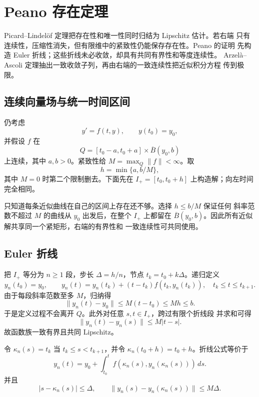 \chapter{Peano 存在定理}
\label{chap:peano-existence}

Picard--Lindelöf 定理把存在性和唯一性同时归结为 Lipschitz 估计。若右端
只有连续性，压缩性消失，但有限维中的紧致性仍能保存存在性。Peano 的证明
先构造 Euler 折线；这些折线未必收敛，却具有共同有界性和等度连续性。
Arzelà--Ascoli 定理抽出一致收敛子列，再由右端的一致连续性把近似积分方程
传到极限。

\section{连续向量场与统一时间区间}

仍考虑
\[
 y'=f(t,y),\qquad y(t_0)=y_0,
\]
并假设 \(f\) 在
\[
 Q=[t_0-a,t_0+a]\times\overline B(y_0,b)
\]
上连续，其中 \(a,b>0\)。紧致性给 \(M=\max_Q\|f\|<\infty\)。取
\[
 h=\min\{a,b/M\},
\]
其中 \(M=0\) 时第二个限制删去。下面先在
\(I_+=[t_0,t_0+h]\) 上构造解；向左时间完全相同。

只知道每条近似曲线在自己的区间上存在还不够。选择 \(h\le b/M\) 保证任何
斜率范数不超过 \(M\) 的曲线从 \(y_0\) 出发后，在整个 \(I_+\) 上都留在
\(\overline B(y_0,b)\)。因此所有近似解共享同一个紧矩形，右端的有界性和
一致连续性可共同使用。

\section{Euler 折线}

把 \(I_+\) 等分为 \(n\ge1\) 段，步长 \(\Delta=h/n\)，节点
\(t_k=t_0+k\Delta\)。递归定义
\[
 y_n(t_0)=y_0,\qquad
 y_n(t)=y_n(t_k)+(t-t_k)f(t_k,y_n(t_k)),
 \quad t_k\le t\le t_{k+1}.
\]
由于每段斜率范数至多 \(M\)，归纳得
\[
 \|y_n(t)-y_0\|\le M(t-t_0)\le Mh\le b.
\]
于是定义过程不会离开 \(Q\)。此外对任意 \(s,t\in I_+\)，跨过有限个折线段
并求和可得
\begin{equation}\label{eq:euler-equilipschitz}
 \|y_n(t)-y_n(s)\|\le M|t-s|.
\end{equation}
故函数族一致有界且共同 Lipschitz。

令 \(\kappa_n(s)=t_k\) 当 \(t_k\le s<t_{k+1}\)，并令
\(\kappa_n(t_0+h)=t_0+h\)。折线公式等价于
\begin{equation}\label{eq:euler-integral-residual}
 y_n(t)=y_0+\int_{t_0}^{t}
 f(\kappa_n(s),y_n(\kappa_n(s)))\,ds.
\end{equation}
并且
\[
 |s-\kappa_n(s)|\le\Delta,\qquad
 \|y_n(s)-y_n(\kappa_n(s))\|\le M\Delta.
\]

